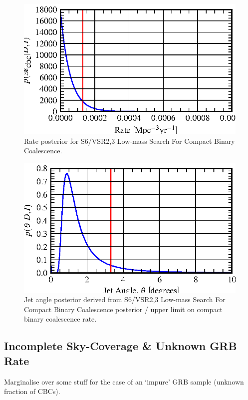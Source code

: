 \documentclass[twocolumn,nofootinbib]{revtex4}
\begin{document}
\begin{figure}
\includegraphics{rate_posterior_s6UL.eps}
\caption{Rate posterior for S6/VSR2,3 Low-mass Search For Compact Binary
Coalescence.\label{fig:reconstructedRatePosterior}}
\end{figure}

\begin{figure}
\includegraphics{jet_angle_posterior_s6UL.eps}
\caption{Jet angle posterior derived from S6/VSR2,3 Low-mass Search For Compact Binary
Coalescence posterior / upper limit on compact binary coalescence
rate.\label{fig:jetPosterior}}
\end{figure}

\subsection{Incomplete Sky-Coverage \& Unknown GRB Rate}
Marginalise over some stuff for the case of an `impure' GRB sample (unknown
fraction of CBCs).
\\
\end{document}
